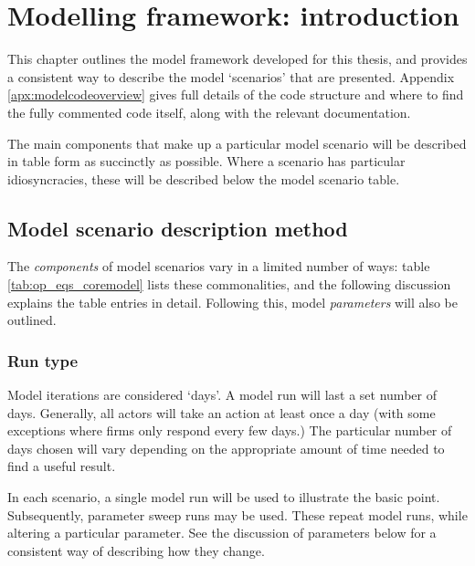\section{Modelling framework: introduction \label{sec:introFramework}}


This chapter outlines the model framework developed for this thesis, and provides a consistent way to describe the model `scenarios' that are presented. Appendix \ref{apx:modelcodeoverview} gives full details of the code structure and where to find the fully commented code itself, along with the relevant documentation. 

The main components that make up a particular model scenario will be described in table form as succinctly as possible. Where a scenario has particular idiosyncracies, these will be described below the model scenario table. 

\subsection{Model scenario description method}

The \emph{components} of model scenarios vary in a limited number of ways: table \ref{tab:op_eqs_coremodel} lists these commonalities, and the following discussion explains the table entries in detail. Following this, model \emph{parameters} will also be outlined. 



\subsubsection{Run type}

Model iterations are considered `days'. A model run will last a set number of days. Generally, all actors will take an action at least once a day (with some exceptions where firms only respond every few days.) The particular number of days chosen will vary depending on the appropriate amount of time needed to find a useful result. 

In each scenario, a single model run will be used to illustrate the basic point. Subsequently, parameter sweep runs may be used. These repeat model runs, while altering a particular parameter. See the discussion of parameters below for a consistent way of describing how they change.

